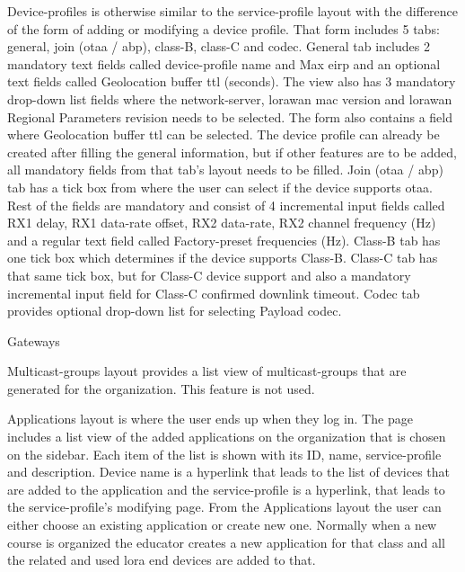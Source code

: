 Device-profiles is otherwise similar to the service-profile layout with the difference of the form of adding or modifying a device profile.
That form includes 5 tabs: general, join (\gls{otaa} / \gls{abp}), class-B, class-C and codec.
General tab includes 2 mandatory text fields called device-profile name and Max \gls{eirp} and an optional text fields called Geolocation buffer \gls{ttl} (seconds). The view also has 3 mandatory drop-down list fields where the network-server, \gls{lorawan} \gls{mac} version and \gls{lorawan} Regional Parameters revision needs to be selected.
The form also contains a field where Geolocation buffer \gls{ttl} can be selected.
The device profile can already be created after filling the general information, but if other features are to be added, all mandatory fields from that tab's layout needs to be filled.
Join (\gls{otaa} / \gls{abp}) tab has a tick box from where the user can select if the device supports \gls{otaa}.
Rest of the fields are mandatory and consist of 4 incremental input fields called RX1 delay, RX1 data-rate offset, RX2 data-rate, RX2 channel frequency (Hz) and a regular text field called Factory-preset frequencies (Hz).
Class-B tab has one tick box which determines if the device supports Class-B.
Class-C tab  has that same tick box, but for Class-C device support and also a mandatory incremental input field for Class-C confirmed downlink timeout.
Codec tab provides optional drop-down list for selecting Payload codec.

Gateways

Multicast-groups layout provides a list view of multicast-groups that are generated for the organization. This feature is not used.

Applications layout is where the user ends up when they log in.
The page includes a list view of the added applications on the organization that is chosen on the sidebar.
Each item of the list is shown with its ID, name, service-profile and description.
Device name is a hyperlink that leads to the list of devices that are added to the application and the service-profile is a hyperlink, that leads to the service-profile's modifying page.
From the Applications layout the user can either choose an existing application or create new one.
Normally when a new course is organized the educator creates a new application for that class and all the related and used \gls{lora} end devices are added to that.

